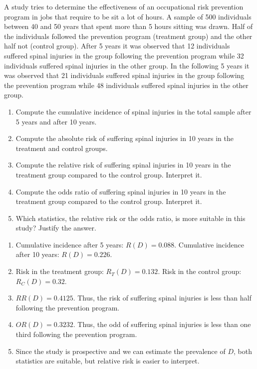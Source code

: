 {A study tries to determine the effectiveness of an occupational risk prevention program in jobs that require to be sit a lot of hours.
A sample of 500 individuals between 40 and 50 years that spent more than 5 hours sitting was drawn. Half of the individuals followed the prevention program (treatment group) and the other half not (control group). After 5 years it was observed that 12 individuals suffered spinal injuries in the group following the prevention program while 32 individuals suffered spinal injuries in the other group. In the following 5 years it was observed that 21 individuals suffered spinal injuries in the group following the prevention program while 48 individuals suffered spinal injuries in the other group. 

\begin{enumerate}
\item Compute the cumulative incidence of spinal injuries in the total sample after 5 years and after 10 years.
\item Compute the absolute risk of suffering spinal injuries in 10 years in the treatment and control groups.
\item Compute the relative risk of suffering spinal injuries in 10 years in the treatment group compared to the control group. Interpret it.
\item Compute the odds ratio of suffering spinal injuries in 10 years in the treatment group compared to the control group. Interpret it.
\item Which statistics, the relative risk or the odds ratio, is more suitable in this study? Justify the answer.
\end{enumerate}
}
{
\begin{enumerate}
\item Cumulative incidence after 5 years: $R(D)=0.088$. Cumulative incidence after 10 years: $R(D)=0.226$.
\item Risk in the treatment group: $R_T(D)=0.132$. Risk in the control group: $R_C(D)=0.32$.
\item $RR(D)=0.4125$. Thus, the risk of suffering spinal injuries is less than half following the prevention program. 
\item $OR(D)=0.3232$. Thus, the odd of suffering spinal injuries is less than one third following the prevention program.
\item Since the study is prospective and we can estimate the prevalence of $D$, both statistics are suitable, but relative risk is easier to interpret.
\end{enumerate}
}
{
}